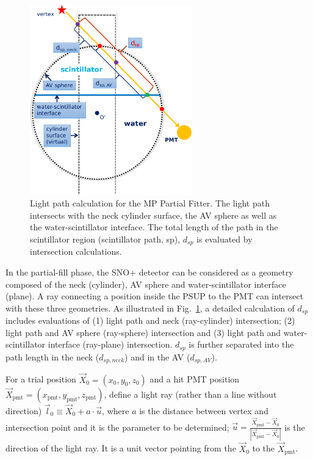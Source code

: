 \begin{figure}[!htb]
	\centering
	\includegraphics[width=7cm]{scintpath.png}
	\caption{Light path calculation for the MP Partial Fitter. The light path intersects with the neck cylinder surface, the AV sphere as well as the water-scintillator interface. The total length of the path in the scintillator region (scintillator path, sp), $d_{sp}$ is evaluated by intersection calculations.}
	\label{scintpath}
\end{figure}

In the partial-fill phase, the SNO+ detector can be considered as a geometry composed of the neck (cylinder), AV sphere and water-scintillator interface (plane). A ray connecting a position inside the PSUP to the PMT can intersect with these three geometries. As illustrated in Fig.~\ref{scintpath}, a detailed calculation of $d_{sp}$ includes evaluations of (1) light path and neck (ray-cylinder) intersection; (2) light path and AV sphere (ray-sphere) intersection and (3) light path and water-scintillator interface (ray-plane) intersection. $d_{sp}$ is further separated into the path length in the neck ($d_{sp,neck}$) and in the AV ($d_{sp,AV}$). 

For a trial position $\vec{X}_0=(x_0,y_0,z_0)$ and a hit PMT position $\vec{X}_{\mathrm{pmt}}=(x_\mathrm{pmt},y_\mathrm{pmt},z_\mathrm{pmt})$, define a light ray (rather than a line without direction) $\vec{l}_0\equiv\vec{X}_0+a\cdot \vec{u}$, where $a$ is the distance between vertex and intersection point and it is the parameter to be determined; $\vec u=\frac{\vec{X}_{\mathrm{pmt}}-\vec{X}_0}{|\vec{X}_{\mathrm{pmt}}-\vec{X}_0|}$ is the direction of the light ray. It is a unit vector pointing from the $\vec{X}_0$ to the $\vec{X}_{\mathrm{pmt}}$.

